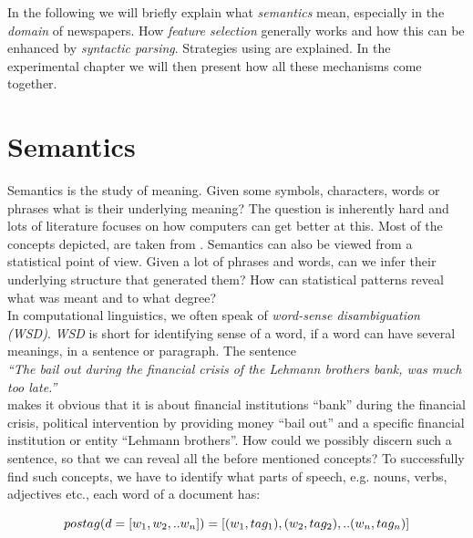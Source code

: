 In the following we will briefly explain what \emph{semantics} mean, especially in the \emph{domain} of newspapers. How \emph{feature selection} generally works and how this can be enhanced by \emph{syntactic parsing}. Strategies using \wordwiki{} are explained. In the experimental chapter we will then present how all these mechanisms come together.

\section{Semantics}
\label{sec:semantics}
  
  Semantics is the study of meaning. Given some symbols, characters, words or phrases what is their underlying meaning? The question is inherently hard and lots of literature focuses on how computers can get better at this. Most of the concepts depicted, are taken from \cite{NLPBookJurafsky2000}. Semantics can also be viewed from a statistical point of view. Given a lot of phrases and words, can we infer their underlying structure that generated them? How can statistical patterns reveal what was meant and to what degree?\\
  In computational linguistics, we often speak of \emph{word-sense disambiguation (WSD)}. \emph{WSD} is short for identifying sense of a word, if a word can have several meanings, in a sentence or paragraph. The sentence\\ 

    \emph{``The bail out during the financial crisis of the Lehmann brothers bank, was much too late.''}\\

  makes it obvious that it is about financial institutions ``bank'' during the financial crisis, political intervention by providing money ``bail out'' and a specific financial institution or entity ``Lehmann brothers''. How could we possibly discern such a sentence, so that we can reveal all the before mentioned concepts? To successfully find such concepts, we have to identify what parts of speech, e.g. nouns, verbs, adjectives etc., each word of a document has:

    \begin{equation}
      pos\-tag(d=[w_1,w_2,..w_n]) = [(w_1, tag_1), (w_2, tag_2),.. (w_n, tag_n)]
    \end{equation}

